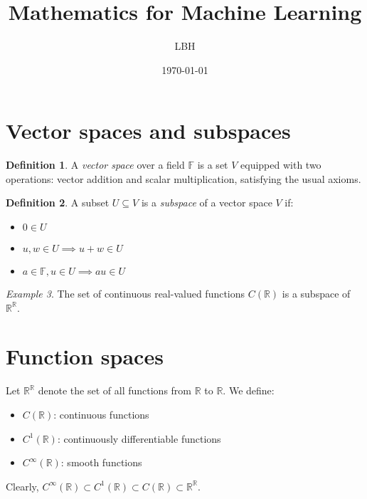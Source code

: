 \documentclass[11pt]{article}
\title{Mathematics for Machine Learning}
\author{LBH}
\date{\today}
\newcommand{\F}{\mathbb{F}}
\newcommand{\R}{\mathbb{R}}
\theoremstyle{definition}
\newtheorem{definition}{Definition}[section]
\theoremstyle{plain}
\theoremstyle{remark}
\newtheorem{example}[definition]{Example}
\begin{document}
\maketitle
\tableofcontents
\vspace{1em}

\section{Vector spaces and subspaces}

\begin{definition}
    A \emph{vector space} over a field \( \F \) is a set \( V \) equipped with two operations: vector addition and
    scalar multiplication, satisfying the usual axioms.
\end{definition}

\begin{definition}
    A subset \( U \subseteq V \) is a \emph{subspace} of a vector space \( V \) if:
    \begin{itemize}
        \item \( 0 \in U \)
        \item \( u, w \in U \implies u + w \in U \)
        \item \( a \in \F, u \in U \implies a u \in U \)
    \end{itemize}
\end{definition}

\begin{example}
    The set of continuous real-valued functions \( C(\R) \) is a subspace of \( \R^\R \).
\end{example}

\section{Function spaces}

Let \( \R^\R \) denote the set of all functions from \( \R \) to \( \R \). We define:

\begin{itemize}
    \item \( C(\R) \): continuous functions
    \item \( C^1(\R) \): continuously differentiable functions
    \item \( C^\infty(\R) \): smooth functions
\end{itemize}

Clearly, \( C^\infty(\R) \subset C^1(\R) \subset C(\R) \subset \R^\R \).
\end{document}
